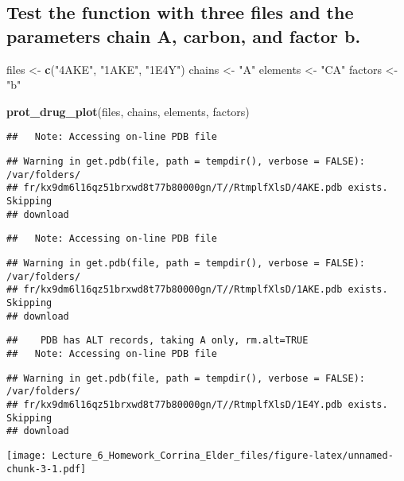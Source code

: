 \documentclass[]{article}
\newenvironment{Shaded}{\begin{snugshade}}{\end{snugshade}}
\newcommand{\KeywordTok}[1]{\textcolor[rgb]{0.13,0.29,0.53}{\textbf{#1}}}
\newcommand{\StringTok}[1]{\textcolor[rgb]{0.31,0.60,0.02}{#1}}
\newcommand{\NormalTok}[1]{#1}
\begin{document}
\subsection{Test the function with three files and the parameters chain
A, carbon, and factor
b.}\label{test-the-function-with-three-files-and-the-parameters-chain-a-carbon-and-factor-b.}

\begin{Shaded}
\begin{Highlighting}[]
\NormalTok{files <-}\StringTok{ }\KeywordTok{c}\NormalTok{(}\StringTok{"4AKE"}\NormalTok{, }\StringTok{"1AKE"}\NormalTok{, }\StringTok{"1E4Y"}\NormalTok{)}
\NormalTok{chains <-}\StringTok{ "A"}
\NormalTok{elements <-}\StringTok{ "CA"}
\NormalTok{factors <-}\StringTok{ "b"}

\KeywordTok{prot_drug_plot}\NormalTok{(files, chains, elements, factors)}
\end{Highlighting}
\end{Shaded}

\begin{verbatim}
##   Note: Accessing on-line PDB file
\end{verbatim}

\begin{verbatim}
## Warning in get.pdb(file, path = tempdir(), verbose = FALSE): /var/folders/
## fr/kx9dm6l16qz51brxwd8t77b80000gn/T//RtmplfXlsD/4AKE.pdb exists. Skipping
## download
\end{verbatim}

\begin{verbatim}
##   Note: Accessing on-line PDB file
\end{verbatim}

\begin{verbatim}
## Warning in get.pdb(file, path = tempdir(), verbose = FALSE): /var/folders/
## fr/kx9dm6l16qz51brxwd8t77b80000gn/T//RtmplfXlsD/1AKE.pdb exists. Skipping
## download
\end{verbatim}

\begin{verbatim}
##    PDB has ALT records, taking A only, rm.alt=TRUE
##   Note: Accessing on-line PDB file
\end{verbatim}

\begin{verbatim}
## Warning in get.pdb(file, path = tempdir(), verbose = FALSE): /var/folders/
## fr/kx9dm6l16qz51brxwd8t77b80000gn/T//RtmplfXlsD/1E4Y.pdb exists. Skipping
## download
\end{verbatim}

\texttt{[image: Lecture\_6\_Homework\_Corrina\_Elder\_files/figure-latex/unnamed-chunk-3-1.pdf]}
\end{document}
